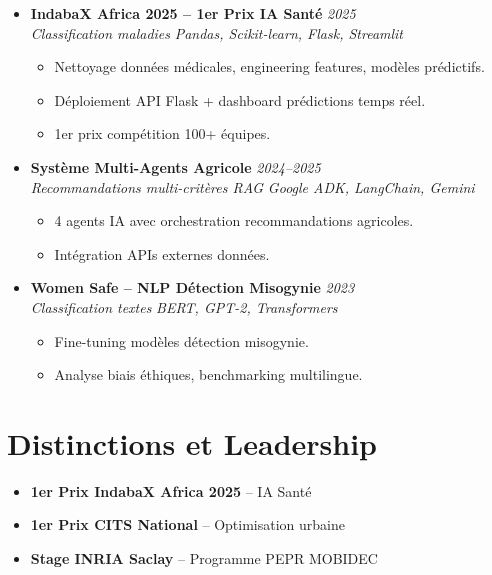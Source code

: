 \documentclass[a4paper,11pt]{article}
\begin{document}
\begin{itemize}[leftmargin=0.5cm, nosep]
    \item \textbf{IndabaX Africa 2025 -- 1er Prix IA Sant\'e} \hfill \textit{2025} \\
    \textit{Classification maladies} \hfill \textit{Pandas, Scikit-learn, Flask, Streamlit}
    \vspace{-2pt}
    \begin{itemize}[leftmargin=0.4cm, nosep, label=\tiny$\bullet$]
        \item \small{Nettoyage donn\'ees m\'edicales, engineering features, mod\`eles pr\'edictifs.}
        \item \small{D\'eploiement API Flask + dashboard pr\'edictions temps r\'eel.}
        \item \small{1er prix comp\'etition 100+ \'equipes.}
    \end{itemize}
    \vspace{3pt}

    \item \textbf{Syst\`eme Multi-Agents Agricole} \hfill \textit{2024--2025} \\
    \textit{Recommandations multi-crit\`eres RAG} \hfill \textit{Google ADK, LangChain, Gemini}
    \vspace{-2pt}
    \begin{itemize}[leftmargin=0.4cm, nosep, label=\tiny$\bullet$]
        \item \small{4 agents IA avec orchestration recommandations agricoles.}
        \item \small{Int\'egration APIs externes donn\'ees.}
    \end{itemize}
    \vspace{3pt}

    \item \textbf{Women Safe -- NLP D\'etection Misogynie} \hfill \textit{2023} \\
    \textit{Classification textes} \hfill \textit{BERT, GPT-2, Transformers}
    \vspace{-2pt}
    \begin{itemize}[leftmargin=0.4cm, nosep, label=\tiny$\bullet$]
        \item \small{Fine-tuning mod\`eles d\'etection misogynie.}
        \item \small{Analyse biais \'ethiques, benchmarking multilingue.}
    \end{itemize}
\end{itemize}

\section{Distinctions et Leadership}
\begin{itemize}[leftmargin=0.5cm, nosep]
    \item \textbf{1er Prix IndabaX Africa 2025} -- IA Sant\'e
    \item \textbf{1er Prix CITS National} -- Optimisation urbaine
    \item \textbf{Stage INRIA Saclay} -- Programme PEPR MOBIDEC
\end{itemize}
\end{document}
